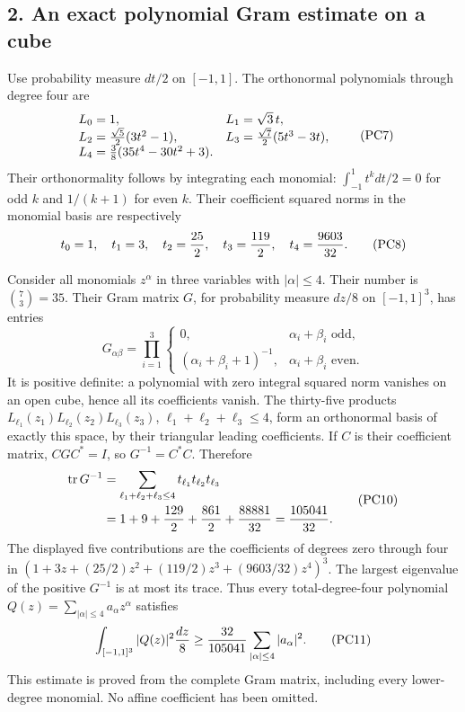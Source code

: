 \documentclass[11pt]{article}
\begin{document}
\subsection*{2. An exact polynomial Gram estimate on a cube}

Use probability measure \(dt/2\) on \([-1,1]\). The orthonormal
polynomials through degree four are
\[
 \begin{array}{ll}
 L_0=1,&L_1=\sqrt3\,t,\\
 L_2={\sqrt5\over2}(3t^2-1),&
 L_3={\sqrt7\over2}(5t^3-3t),\\
 L_4={3\over8}(35t^4-30t^2+3).
 \end{array}
 \tag{PC7}
\]
Their orthonormality follows by integrating each monomial:
\(\int_{-1}^1t^kdt/2=0\) for odd \(k\) and \(1/(k+1)\) for even
\(k\). Their coefficient squared norms in the monomial basis are
respectively
\[
 t_0=1,\quad t_1=3,\quad t_2={25\over2},\quad
 t_3={119\over2},\quad t_4={9603\over32}.
 \tag{PC8}
\]

Consider all monomials \(z^\alpha\) in three variables with
\(|\alpha|\le4\). Their number is \(\binom73=35\). Their Gram
matrix \(G\), for probability measure \(dz/8\) on \([-1,1]^3\),
has entries
\[
 G_{\alpha\beta}
 =\prod_{i=1}^3
 \begin{cases}
 0,&\alpha_i+\beta_i\text{ odd},\\
 (\alpha_i+\beta_i+1)^{-1},&\alpha_i+\beta_i\text{ even}.
 \end{cases}
 \tag{PC9}
\]
It is positive definite: a polynomial with zero integral squared norm
vanishes on an open cube, hence all its coefficients vanish.
The thirty-five products
\(L_{\ell_1}(z_1)L_{\ell_2}(z_2)L_{\ell_3}(z_3)\),
\(\ell_1+\ell_2+\ell_3\le4\), form an orthonormal basis of exactly
this space, by their triangular leading coefficients.
If \(C\) is their coefficient matrix, \(CGC^*=I\), so
\(G^{-1}=C^*C\). Therefore
\[
 \begin{aligned}
 \operatorname{tr}G^{-1}
 &=\sum_{\ell_1+\ell_2+\ell_3\le4}t_{\ell_1}t_{\ell_2}t_{\ell_3}\\
 &=1+9+{129\over2}+{861\over2}+{88881\over32}
   ={105041\over32}.
 \end{aligned}\tag{PC10}
\]
The displayed five contributions are the coefficients of degrees
zero through four in
\((1+3z+(25/2)z^2+(119/2)z^3+(9603/32)z^4)^3\).
The largest eigenvalue of the positive \(G^{-1}\) is at most its
trace. Thus every total-degree-four polynomial
\(Q(z)=\sum_{|\alpha|\le4}a_\alpha z^\alpha\) satisfies
\[
 \int_{[-1,1]^3}|Q(z)|^2{dz\over8}
 \ge {32\over105041}\sum_{|\alpha|\le4}|a_\alpha|^2.
 \tag{PC11}
\]
This estimate is proved from the complete Gram matrix, including
every lower-degree monomial. No affine coefficient has been omitted.
\end{document}
